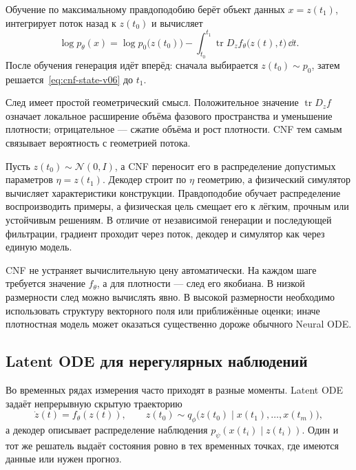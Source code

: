 Обучение по максимальному правдоподобию берёт объект данных $x=z(t_1)$, интегрирует поток назад к $z(t_0)$ и вычисляет
\begin{equation}
\label{eq:cnf-log-likelihood-v06}
\log p_\theta(x)
=
\log p_0\bigl(z(t_0)\bigr)
-
\int_{t_0}^{t_1}
\operatorname{tr}D_zf_\theta\bigl(z(t),t\bigr)\,\dd t.
\end{equation}
После обучения генерация идёт вперёд: сначала выбирается $z(t_0)\sim p_0$, затем решается~\eqref{eq:cnf-state-v06} до $t_1$.

След имеет простой геометрический смысл. Положительное значение $\operatorname{tr}D_zf$ означает локальное расширение объёма фазового пространства и уменьшение плотности; отрицательное --- сжатие объёма и рост плотности. CNF тем самым связывает вероятность с геометрией потока.

\begin{application}
Пусть $z(t_0)\sim\mathcal N(0,I)$, а CNF переносит его в распределение допустимых параметров $\eta=z(t_1)$. Декодер строит по $\eta$ геометрию, а физический симулятор вычисляет характеристики конструкции. Правдоподобие обучает распределение воспроизводить примеры, а физическая цель смещает его к лёгким, прочным или устойчивым решениям. В отличие от независимой генерации и последующей фильтрации, градиент проходит через поток, декодер и симулятор как через единую модель.
\end{application}

CNF не устраняет вычислительную цену автоматически. На каждом шаге требуется значение $f_\theta$, а для плотности --- след его якобиана. В низкой размерности след можно вычислять явно. В высокой размерности необходимо использовать структуру векторного поля или приближённые оценки; иначе плотностная модель может оказаться существенно дороже обычного Neural ODE.

\subsection{Latent ODE для нерегулярных наблюдений}

Во временных рядах измерения часто приходят в разные моменты. Latent ODE задаёт непрерывную скрытую траекторию
\begin{equation}
\label{eq:latent-ode-v06}
\dot z(t)=f_\theta(z(t)),
\qquad
z(t_0)\sim q_\phi
\bigl(z(t_0)\mid x(t_1),\ldots,x(t_m)\bigr),
\end{equation}
а декодер описывает распределение наблюдения $p_\psi(x(t_i)\mid z(t_i))$. Один и тот же решатель выдаёт состояния ровно в тех временных точках, где имеются данные или нужен прогноз.


